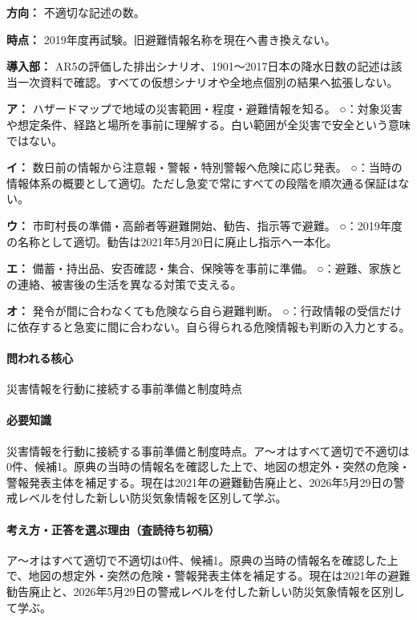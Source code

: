 \noindent\textbf{方向：} 不適切な記述の数。\par

\noindent\textbf{時点：} 2019年度再試験。旧避難情報名称を現在へ書き換えない。\par

\noindent\textbf{導入部：} AR5の評価した排出シナリオ、1901〜2017日本の降水日数の記述は該当一次資料で確認。すべての仮想シナリオや全地点個別の結果へ拡張しない。\par

\noindent\textbf{ア：} ハザードマップで地域の災害範囲・程度・避難情報を知る。 ○：対象災害や想定条件、経路と場所を事前に理解する。白い範囲が全災害で安全という意味ではない。\par

\noindent\textbf{イ：} 数日前の情報から注意報・警報・特別警報へ危険に応じ発表。 ○：当時の情報体系の概要として適切。ただし急変で常にすべての段階を順次通る保証はない。\par

\noindent\textbf{ウ：} 市町村長の準備・高齢者等避難開始、勧告、指示等で避難。 ○：2019年度の名称として適切。勧告は2021年5月20日に廃止し指示へ一本化。\par

\noindent\textbf{エ：} 備蓄・持出品、安否確認・集合、保険等を事前に準備。 ○：避難、家族との連絡、被害後の生活を異なる対策で支える。\par

\noindent\textbf{オ：} 発令が間に合わなくても危険なら自ら避難判断。 ○：行政情報の受信だけに依存すると急変に間に合わない。自ら得られる危険情報も判断の入力とする。\par

\paragraph{問われる核心} 災害情報を行動に接続する事前準備と制度時点

\paragraph{必要知識} 災害情報を行動に接続する事前準備と制度時点。ア〜オはすべて適切で不適切は0件、候補1。原典の当時の情報名を確認した上で、地図の想定外・突然の危険・警報発表主体を補足する。現在は2021年の避難勧告廃止と、2026年5月29日の警戒レベルを付した新しい防災気象情報を区別して学ぶ。

\paragraph{考え方・正答を選ぶ理由（査読待ち初稿）} ア〜オはすべて適切で不適切は0件、候補1。原典の当時の情報名を確認した上で、地図の想定外・突然の危険・警報発表主体を補足する。現在は2021年の避難勧告廃止と、2026年5月29日の警戒レベルを付した新しい防災気象情報を区別して学ぶ。

